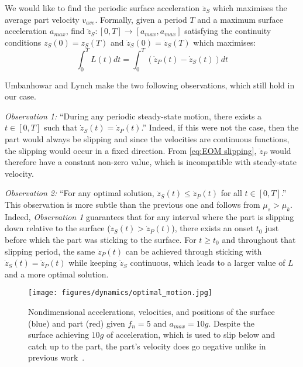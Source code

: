 We would like to find the periodic surface acceleration $\ddot{z}_S$ which maximises the average part velocity $v_{ave}$. Formally, given a period $T$ and a maximum surface acceleration $a_{max}$, find $\ddot{z}_S \colon [0,T] \rightarrow \left[a_{max}, a_{max}\right]$ satisfying the continuity conditions $z_S(0) = z_S(T)$ and $\dot{z}_S(0) = \dot{z}_S(T)$ which maximises:
%
\begin{equation}\label{eq: maximize L}
    \int_0^T L(t) dt = \int_0^T (\dot{z}_P(t)-\dot{z}_S(t)) dt
\end{equation}

Umbanhowar and Lynch make the two following observations, which still hold in our case.

\textit{Observation 1:} ``During any periodic steady-state motion, there
exists a $t \in \left[0,T\right]$ such that $\dot{z}_S(t) = \dot{z}_P(t)$.'' 
%
Indeed, if this were not the case, then the part would always be slipping and since the velocities are continuous functions, the slipping would occur in a fixed direction. 
%
From \eqref{eq:EOM slipping}, $\ddot{z}_P$ would therefore have a constant non-zero value, which is incompatible with steady-state velocity.

\textit{Observation 2:} ``For any optimal solution, $\dot{z}_S(t) \leq \dot{z}_P(t)$ for all $t \in \left[0,T\right]$.'' 
%
This observation is more subtle than the previous one and follows from $\mu_s > \mu_k$. 
%
Indeed, \textit{Observation 1} guarantees that for any interval where the part is slipping down relative to the surface ($\dot{z}_S(t) > \dot{z}_P(t)$), there exists an onset $t_0$ just before which the part was sticking to the surface. 
%
For $t \geq t_0$ and throughout that slipping period, the same $\dot{z}_P(t)$ can be achieved through sticking with $\dot{z}_S(t) = \dot{z}_P(t)$ while keeping $\dot{z}_S$ continuous, which leads to a larger value of $L$ and a more optimal solution.

\begin{figure}[t]
    \centering
    \texttt{[image: figures/dynamics/optimal\_motion.jpg]}
    \caption{Nondimensional accelerations, velocities, and positions of the surface (blue) and part (red) given $f_n = 5$ and $a_{max} = 10g$. Despite the surface achieving $10g$ of acceleration, which is used to slip below and catch up to the part, the part's velocity does go negative unlike in previous work~\cite{umbanhowar2008optimal}.}
    \label{figure: optimal motion}
    \vspace{\shift}
\end{figure}

